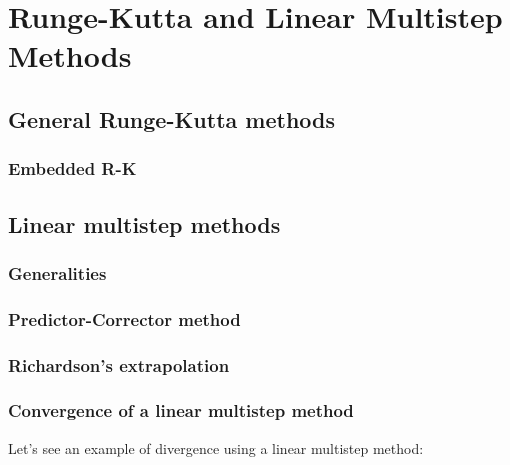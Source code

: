 \section{Runge-Kutta and Linear Multistep Methods}

\subsection{General Runge-Kutta methods}
\subsubsection{Embedded R-K}

\newpage

\subsection{Linear multistep methods}
\subsubsection{Generalities}
\subsubsection{Predictor-Corrector method}
\subsubsection{Richardson's extrapolation}
\subsubsection{Convergence of a linear multistep method}

Let's see an example of divergence using a linear multistep method:

